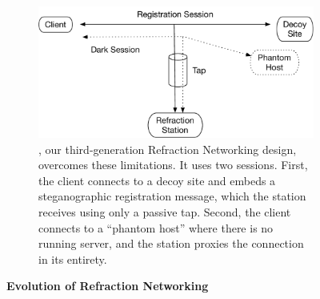 {\begin{figure}
  \begin{subfigure}{\columnwidth}
    \includegraphics[width=\columnwidth]{figures/dark-decoys}
    \vspace{-3pt}

    \caption{\textbf{\scheme}, our third-generation Refraction Networking design, overcomes these limitations.  It uses two sessions. First, the client connects to a decoy site and embeds a steganographic registration message, which the station receives using only a passive tap.  Second, the client connects to a ``phantom host'' where there is no running server, and the station proxies the connection in its entirety.}
    \label{fig:dark-decoys}
  \end{subfigure}

  \vspace{12pt}
  \caption{\textbf{Evolution of Refraction Networking}}
\end{figure}
}
